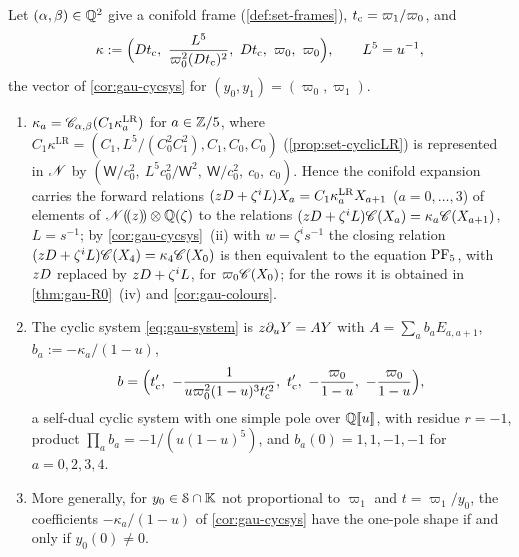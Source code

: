 \begin{prop}
\label{prop:gau-quintic}
Let $(\alpha,\beta)\in\mathbb{Q}^2$ give a conifold frame (\cref{def:set-frames}), $t_{\mathrm{c}}=\varpi_1/\varpi_0$, and
\[
\kappa:=\Bigl(\Dq\tc,\ \frac{L^5}{\varpi_0^2(\Dq\tc)^2},\ \Dq\tc,\ \varpi_0,\ \varpi_0\Bigr),\qquad L^5=u^{-1},
\]
the vector of \cref{cor:gau-cycsys} for $(y_0,y_1)=(\varpi_0,\varpi_1)$.
\begin{enumerate}
\item $\kappa_a=\mathscr{C}_{\alpha,\beta}(C_1\kappa^{\mathrm{LR}}_a)$ for $a\in\mathbb{Z}/5$, where $C_1\kappa^{\mathrm{LR}}=(C_1,L^5/(C_0^2C_1^2),C_1,C_0,C_0)$ (\cref{prop:set-cyclicLR}) is represented in $\mathscr{N}$ by $(\mathsf W/c_0^2,\ L^5c_0^2/\mathsf W^2,\ \mathsf W/c_0^2,\ c_0,\ c_0)$. Hence the conifold expansion carries the forward relations $(zD+\zeta^iL)X_a=C_1\kappa^{\mathrm{LR}}_aX_{a+1}$ ($a=0,\dots,3$) of elements of $\mathscr{N}(\!(z)\!)\otimes\mathbb{Q}(\zeta)$ to the relations $(zD+\zeta^iL)\mathscr{C}(X_a)=\kappa_a\mathscr{C}(X_{a+1})$, $L=s^{-1}$; by \cref{cor:gau-cycsys}~(ii) with $w=\zeta^is^{-1}$ the closing relation $(zD+\zeta^iL)\mathscr{C}(X_4)=\kappa_4\mathscr{C}(X_0)$ is then equivalent to the equation $\mathrm{PF}_{5}$, with $zD$ replaced by $zD+\zeta^iL$, for $\varpi_0\mathscr{C}(X_0)$; for the rows it is obtained in \cref{thm:gau-R0}~(iv) and \cref{cor:gau-colours}.
\item The cyclic system \eqref{eq:gau-system} is $z\partial_uY=AY$ with $A=\sum_ab_aE_{a,a+1}$, $b_a:=-\kappa_a/(1-u)$,
\[
b=\Bigl(\tc',\ -\frac1{u\varpi_0^2(1-u)^3\tc'^2},\ \tc',\ -\frac{\varpi_0}{1-u},\ -\frac{\varpi_0}{1-u}\Bigr),
\]
a self-dual cyclic system with one simple pole over $\mathbb{Q}[\![ u ]\!]$, with residue $r=-1$, product $\prod_ab_a=-1/(u(1-u)^5)$, and $b_a(0)=1,1,-1,-1$ for $a=0,2,3,4$.
\item More generally, for $y_0\in\mathcal S\cap\mathbb{K}$ not proportional to $\varpi_1$ and $t=\varpi_1/y_0$, the coefficients $-\kappa_a/(1-u)$ of \cref{cor:gau-cycsys} have the one-pole shape if and only if $y_0(0)\neq0$.
\end{enumerate}
\end{prop}

